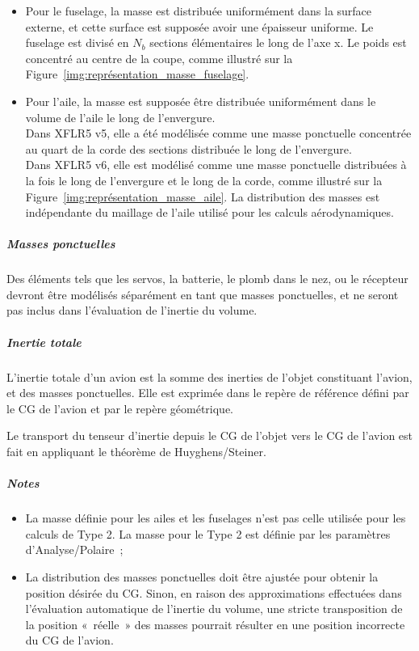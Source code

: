\documentclass[a4paper,twoside,12pt,dvips]{article}
\begin{document}
\begin{itemize}
	\item Pour le fuselage, la masse est distribuée uniformément dans la surface 
	externe, et cette surface est supposée avoir une épaisseur uniforme. Le 
	fuselage est divisé en $N_b$ sections élémentaires le long de l’axe x. Le 
	poids est concentré au centre de la coupe, comme illustré sur la 
	Figure~\ref{img:représentation_masse_fuselage}.
	\item Pour l’aile, la masse est supposée être distribuée uniformément dans
	le volume de l’aile le long de l’envergure.\\
	Dans XFLR5 v5, elle a été modélisée comme une masse ponctuelle concentrée au
	quart de la corde des sections distribuée le long de l’envergure.\\
	Dans XFLR5 v6, elle est modélisé comme une masse ponctuelle distribuées à la
	fois le long de l’envergure et le long de la corde, comme illustré sur la 
	Figure~\ref{img:représentation_masse_aile}. La distribution des masses est
	indépendante du maillage de l’aile utilisé pour les calculs aérodynamiques.
\end{itemize}

\subparagraph{Masses ponctuelles}

Des éléments tels que les servos, la batterie, le plomb dans le nez, ou le récepteur devront être modélisés séparément en tant que masses ponctuelles, et ne seront pas inclus dans l’évaluation de l’inertie du volume.

\subparagraph{Inertie totale}

L’inertie totale d’un avion est la somme des inerties de l’objet constituant l’avion, et des masses ponctuelles. Elle est exprimée dans le repère de référence défini par le CG de l’avion et par le repère géométrique.

Le transport du tenseur d’inertie depuis le CG de l’objet vers le CG de l’avion
est fait en appliquant le théorème de Huyghens/Steiner.

\subparagraph{Notes}

\begin{itemize}
	\item La masse définie pour les ailes et les fuselages n’est pas celle 
	utilisée pour les calculs de Type 2. La masse pour le Type 2 est définie par
	les paramètres d’Analyse/Polaire~;
	\item La distribution des masses ponctuelles doit être ajustée pour obtenir 
	la position désirée du CG. Sinon, en raison des approximations effectuées 
	dans l’évaluation automatique de l’inertie du volume, une stricte 
	transposition de la position «~réelle~» des masses pourrait résulter en une
	position incorrecte du CG de l’avion.
\end{itemize}
\end{document}
